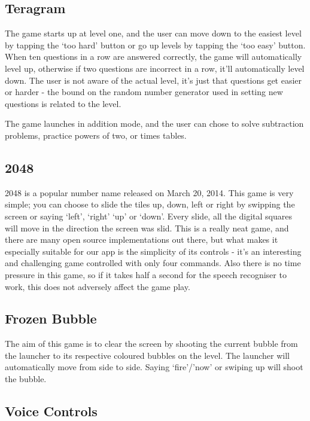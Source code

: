 \documentclass[11pt, oneside]{article}
\begin{document}
\subsection{Teragram}

The game starts up at level one, and the user can move down to the
easiest level by tapping the `too hard' button or go up levels by
tapping the `too easy' button. When ten questions in a row are
answered correctly, the game will automatically level up, otherwise if
two questions are incorrect in a row, it'll automatically level down.
The user is not aware of the actual level, it's just that questions
get easier or harder - the bound on the random number generator used
in setting new questions is related to the level.

The game launches in addition mode, and the user can chose to solve
subtraction problems, practice powers of two, or times tables.

\subsection{2048}

2048 is a popular number name released on March 20, 2014. This game is
very simple; you can choose to slide the tiles up, down, left or right
by swipping the screen or saying `left', `right' `up' or `down'. Every
slide, all the digital squares will move in the direction the screen was slid. 
This is a really neat game, and there are many open source
implementations out there, but what makes it especially suitable for
our app is the simplicity of its controls - it's an interesting and
challenging game controlled with only four commands. Also there is no
time pressure in this game, so if it takes half a second for the
speech recogniser to work, this does not adversely affect the game
play.

\subsection{Frozen Bubble}
The aim of this game is to clear the screen by shooting the current
bubble from the launcher to its respective coloured bubbles on the
level. The launcher will automatically move from side to side. Saying `fire'/'now' or swiping up will shoot the bubble.

\subsection{Voice Controls}
\end{document}
